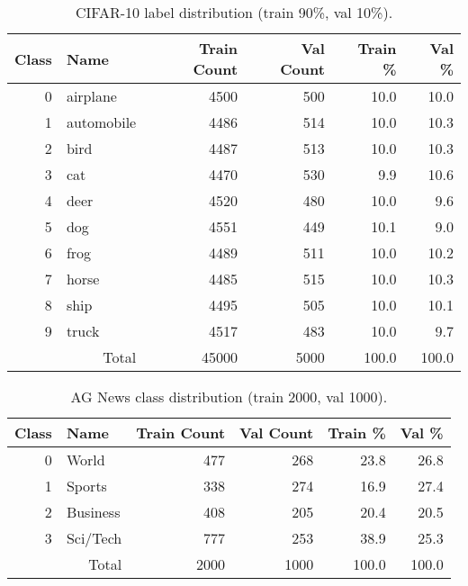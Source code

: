 \documentclass[11pt,a4paper]{article}
\begin{document}
\begin{table}[H]
\centering
\caption{CIFAR-10 label distribution (train 90\%, val 10\%).}
\begin{tabular}{@{}r l r r r r@{}}
\toprule
Class & Name & Train Count & Val Count & Train \% & Val \% \\
\midrule
0 & airplane & 4500 & 500 & 10.0 & 10.0 \\
1 & automobile & 4486 & 514 & 10.0 & 10.3 \\
2 & bird & 4487 & 513 & 10.0 & 10.3 \\
3 & cat & 4470 & 530 & 9.9 & 10.6 \\
4 & deer & 4520 & 480 & 10.0 & 9.6 \\
5 & dog & 4551 & 449 & 10.1 & 9.0 \\
6 & frog & 4489 & 511 & 10.0 & 10.2 \\
7 & horse & 4485 & 515 & 10.0 & 10.3 \\
8 & ship & 4495 & 505 & 10.0 & 10.1 \\
9 & truck & 4517 & 483 & 10.0 & 9.7 \\
\midrule
\multicolumn{2}{r}{Total} & 45000 & 5000 & 100.0 & 100.0 \\
\bottomrule
\end{tabular}
\end{table}

\begin{table}[H]
\centering
\caption{AG News class distribution (train 2000, val 1000).}
\begin{tabular}{@{}r l r r r r@{}}
\toprule
Class & Name & Train Count & Val Count & Train \% & Val \% \\
\midrule
0 & World    & 477 & 268 & 23.8 & 26.8 \\
1 & Sports   & 338 & 274 & 16.9 & 27.4 \\
2 & Business & 408 & 205 & 20.4 & 20.5 \\
3 & Sci/Tech & 777 & 253 & 38.9 & 25.3 \\
\midrule
\multicolumn{2}{r}{Total} & 2000 & 1000 & 100.0 & 100.0 \\
\bottomrule
\end{tabular}
\end{table}
\end{document}
